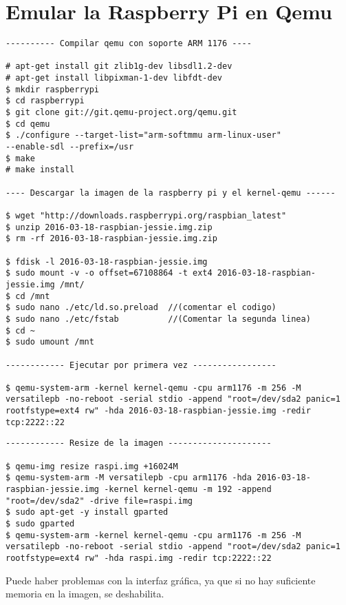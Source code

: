 \chapter{Emular la Raspberry Pi en Qemu}

\begin{lstlisting}[style=Bash]
---------- Compilar qemu con soporte ARM 1176 ----

# apt-get install git zlib1g-dev libsdl1.2-dev
# apt-get install libpixman-1-dev libfdt-dev
$ mkdir raspberrypi
$ cd raspberrypi
$ git clone git://git.qemu-project.org/qemu.git
$ cd qemu
$ ./configure --target-list="arm-softmmu arm-linux-user" 
--enable-sdl --prefix=/usr
$ make
# make install

---- Descargar la imagen de la raspberry pi y el kernel-qemu ------

$ wget "http://downloads.raspberrypi.org/raspbian_latest"
$ unzip 2016-03-18-raspbian-jessie.img.zip    
$ rm -rf 2016-03-18-raspbian-jessie.img.zip	  

$ fdisk -l 2016-03-18-raspbian-jessie.img 
$ sudo mount -v -o offset=67108864 -t ext4 2016-03-18-raspbian-jessie.img /mnt/
$ cd /mnt
$ sudo nano ./etc/ld.so.preload  //(comentar el codigo)
$ sudo nano ./etc/fstab 	 	 //(Comentar la segunda linea)
$ cd ~
$ sudo umount /mnt

------------ Ejecutar por primera vez -----------------

$ qemu-system-arm -kernel kernel-qemu -cpu arm1176 -m 256 -M versatilepb -no-reboot -serial stdio -append "root=/dev/sda2 panic=1 rootfstype=ext4 rw" -hda 2016-03-18-raspbian-jessie.img -redir tcp:2222::22
\end{lstlisting}
\pagebreak
\begin{lstlisting}[style=Bash]
------------ Resize de la imagen ---------------------

$ qemu-img resize raspi.img +16024M 
$ qemu-system-arm -M versatilepb -cpu arm1176 -hda 2016-03-18-raspbian-jessie.img -kernel kernel-qemu -m 192 -append "root=/dev/sda2" -drive file=raspi.img
$ sudo apt-get -y install gparted
$ sudo gparted
$ qemu-system-arm -kernel kernel-qemu -cpu arm1176 -m 256 -M versatilepb -no-reboot -serial stdio -append "root=/dev/sda2 panic=1 rootfstype=ext4 rw" -hda raspi.img -redir tcp:2222::22
\end{lstlisting}

Puede haber problemas con la interfaz gráfica, ya que si no hay suficiente memoria en la imagen, se deshabilita. 
